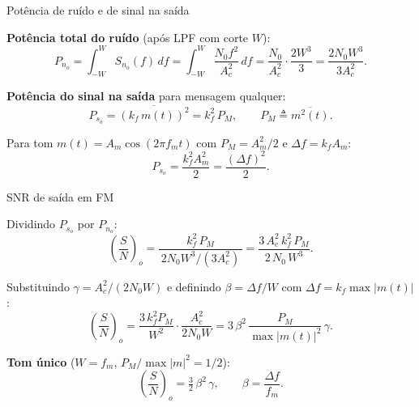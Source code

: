 
\begin{frame}{Potência de ruído e de sinal na saída}

\textbf{Potência total do ruído} (após LPF com corte $W$):
\[
P_{n_o} = \int_{-W}^{W} S_{n_o}(f)\, df = \int_{-W}^{W} \frac{N_0 f^2}{A_c^2}\, df = \frac{N_0}{A_c^2}\cdot\frac{2 W^3}{3} = \frac{2 N_0 W^3}{3 A_c^2}.
\]

\textbf{Potência do sinal na saída} para mensagem qualquer:
\[
P_{s_o} = \overline{(k_f\,m(t))^2} = k_f^2\, P_M, \qquad P_M \triangleq \overline{m^2(t)}.
\]

Para tom $m(t) = A_m\cos(2\pi f_m t)$ com $P_M = A_m^2/2$ e $\Delta f = k_f A_m$:
\[
P_{s_o} = \frac{k_f^2 A_m^2}{2} = \frac{(\Delta f)^2}{2}.
\]

\end{frame}


\begin{frame}{SNR de saída em FM}

Dividindo $P_{s_o}$ por $P_{n_o}$:
\[
\left(\frac{S}{N}\right)_o
   = \frac{k_f^2\, P_M}{\,2 N_0 W^3 / (3 A_c^2)\,}
   = \frac{3\, A_c^2\, k_f^2\, P_M}{2\, N_0\, W^3}.
\]

Substituindo $\gamma = A_c^2/(2 N_0 W)$ e definindo $\beta = \Delta f/W$ com $\Delta f = k_f\max|m(t)|$:
\[
\left(\frac{S}{N}\right)_o
   = \frac{3\, k_f^2 P_M}{W^2}\cdot\frac{A_c^2}{2 N_0 W}
   = 3\,\beta^2\,\frac{P_M}{\max|m(t)|^2}\,\gamma.
\]

\textbf{Tom único} ($W = f_m$, $P_M/\max|m|^2 = 1/2$):
\[
\boxed{\left(\frac{S}{N}\right)_o = \tfrac{3}{2}\,\beta^2\, \gamma}, \qquad \beta = \frac{\Delta f}{f_m}.
\]

\end{frame}


